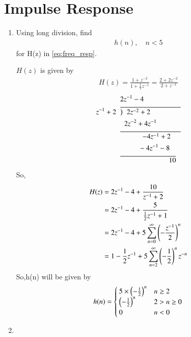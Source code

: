 \documentclass[journal,12pt,twocolumn]{IEEEtran}
\renewcommand\thesection{\arabic{section}}
\begin{document}
\section{Impulse Response}
\begin{enumerate}[label=\thesection.\arabic*]
	\item Using long division, 
	find
	\begin{align}
		h(n), \quad n < 5
	\end{align}
	for H(z) in 
	\eqref{eq:freq_resp}.
	
	\solution $H(z)$ is given by
	\begin{align}
		H(z)=\frac{1+z^{-2}}{1+\frac{1}{2}z^{-1}}=\frac{2+2z^{-2}}{2+z^{-1}}
	\end{align}
	\begin{align}
		&2z^{-1}-4 \nonumber \\	
		z^{-1}+2\hspace{2mm}&\overline{\big)\hspace{2mm} 2z^{-2}+2\hspace{15mm}} \nonumber\\
		& \hspace{2mm} 2z^{-2}+4z^{-1} \nonumber\\
		&\overline{\hspace{11mm}-4z^{-1}+2\hspace{5mm}} \nonumber\\
		&\hspace{9mm}-4z^{-1}-8 \nonumber\\ 
		&\overline{\hspace{24mm}10} \nonumber
	\end{align}
	So,
	\begin{align}
		H(z)&=2z^{-1}-4+\frac{10}{z^{-1}+2}\\
		&=2z^{-1}-4+\frac{5}{\frac{1}{2}z^{-1}+1}\\
		&=2z^{-1}-4+5\sum_{n=0}^\infty \left(-\frac{z^{-1}}{2}\right)^{n}\\
		&=1-\frac{1}{2}z^{-1}+5\sum_{n=2}^\infty \left(-\frac{1}{2}\right)^{n}z^{-n}
	\end{align}
	So,h(n) will be given by 
	\begin{align}
		h(n)=\begin{cases}
			\label{eq:h_n_def}
			5\times \left(-\frac{1}{2}\right)^n  & n\geq 2\\
			\left(-\frac{1}{2}\right)^n  &2>n\geq0\\
			0 &n<0
		\end{cases}
	\end{align}
	\item \label{prob:impulse_resp}

\end{enumerate}
\end{document}
